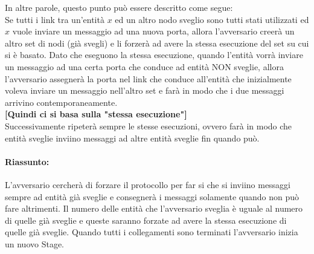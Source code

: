 \begin{enumerate}
\begin{enumerate}
                    In altre parole, questo punto può essere descritto come
                    segue:\\
                    Se tutti i link tra un'entità $x$ ed un altro nodo sveglio
                    sono tutti stati utilizzati ed $x$ vuole inviare un
                    messaggio ad una nuova porta, allora l'avversario creerà un
                    altro set di nodi (già svegli) e li forzerà ad avere la
                    stessa esecuzione del set su cui si è basato. Dato che
                    eseguono la stessa esecuzione, quando l'entità vorrà inviare
                    un messaggio ad una certa porta che conduce ad entità NON
                    sveglie, allora l'avversario assegnerà la porta nel link che
                    conduce all'entità che inizialmente voleva inviare un
                    messaggio nell'altro set e farà in modo che i due messaggi
                    arrivino contemporaneamente. \\\textbf{[Quindi ci si basa
                                sulla "stessa esecuzione"]}\\
                    Successivamente ripeterà sempre le stesse esecuzioni, ovvero
                    farà in modo che entità sveglie inviino messaggi ad altre
                    entità sveglie fin quando può.
          \end{enumerate}
\end{enumerate}

\paragraph{Riassunto:} L'avversario cercherà di forzare il protocollo per far si
che si inviino messaggi sempre ad entità già sveglie e consegnerà i messaggi
solamente quando non può fare altrimenti. Il numero delle entità che
l'avversario sveglia è uguale al numero di quelle già sveglie e queste saranno
forzate ad avere la stessa esecuzione di quelle già sveglie. Quando tutti i
collegamenti sono terminati l'avversario inizia un nuovo Stage.


